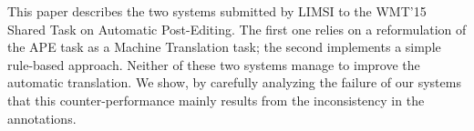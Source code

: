This paper describes the two systems submitted by LIMSI to the WMT'15 Shared Task on Automatic Post-Editing. The first one relies on a reformulation of the APE task as a Machine Translation task; the second implements a simple rule-based approach. Neither of these two systems manage to improve the automatic translation. We show, by carefully analyzing the failure of our systems that this counter-performance mainly results from the inconsistency in the annotations.
